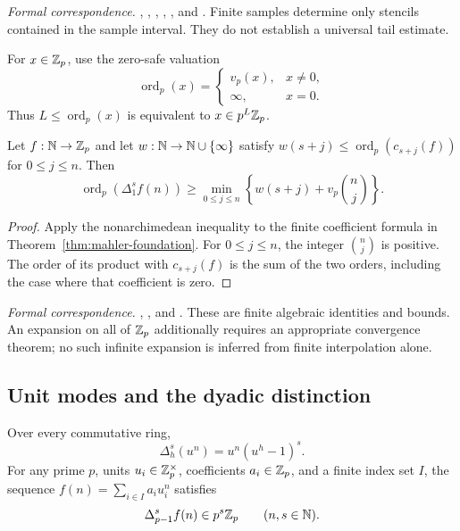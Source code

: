 \begingroup\small\raggedright
\noindent\emph{Formal correspondence.}
,
,
,
,
, and
.
Finite samples determine only stencils contained in the sample interval.
They do not establish a universal tail estimate.
\par\endgroup

For $x\in\mathbb Z_p$, use the zero-safe valuation
\[
\operatorname{ord}_p(x)=
\begin{cases}v_p(x),&x\ne0,\\\infty,&x=0.\end{cases}
\]
Thus $L\leq\operatorname{ord}_p(x)$ is equivalent to $x\in p^L\mathbb Z_p$.

\begin{theorem}
\label{thm:weighted-mahler-foundation}
Let $f:\mathbb N\to\mathbb Z_p$ and let $w:\mathbb N\to\mathbb N\cup\{\infty\}$ satisfy
$w(s+j)\leq\operatorname{ord}_p(c_{s+j}(f))$ for $0\leq j\leq n$.
Then
\[
\operatorname{ord}_p(\Delta_1^s f(n))\geq
\min_{0\leq j\leq n}
\left\{w(s+j)+v_p\binom nj\right\}.
\]
\end{theorem}

\begin{proof}
Apply the nonarchimedean inequality to the finite coefficient formula in
Theorem~\ref{thm:mahler-foundation}. For $0\leq j\leq n$, the integer
$\binom nj$ is positive. The order of its product with $c_{s+j}(f)$ is the
sum of the two orders, including the case where that coefficient is zero.
\end{proof}

\begingroup\small\raggedright
\noindent\emph{Formal correspondence.}
,
, and
.
These are finite algebraic identities and bounds. An expansion on all of
$\mathbb Z_p$ additionally requires an appropriate convergence theorem; no such
infinite expansion is inferred from finite interpolation alone.
\par\endgroup

\subsection{Unit modes and the dyadic distinction}

\begin{theorem}
\label{thm:unit-modes-foundation}
Over every commutative ring,
\[
\Delta_h^s(u^n)=u^n(u^h-1)^s.
\]
For any prime $p$, units $u_i\in\mathbb Z_p^\times$, coefficients $a_i\in\mathbb Z_p$, and
a finite index set $I$, the sequence $f(n)=\sum_{i\in I}a_i u_i^n$ satisfies
\[
\Delta_{p-1}^s f(n)\in p^s\mathbb Z_p
\qquad(n,s\in\mathbb N).
\]
\end{theorem}

